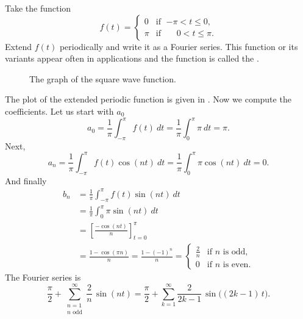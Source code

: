 \documentclass[12pt]{book}
\begin{document}
\begin{example}
Take the function
\begin{equation*}
f(t) =
\begin{cases}
0 & \text{if } \;{-\pi} < t \leq 0 , \\
\pi & \text{if } \;\phantom{-}0 < t \leq \pi .
\end{cases}
\end{equation*}
\nopagebreak[4]%
Extend $f(t)$ periodically and write it 
as a Fourier series.  This function or its variants appear often
in applications and the function is called the
\emph{}.

\begin{figure}[h!t]
\capstart
\begin{center}
\caption{The graph of the square wave function.\label{ts:squarewavefig}}
\end{center}
\end{figure}

The plot of the extended periodic function is given in
.
Now we compute the coefficients.  Let us start with $a_0$
\begin{equation*}
a_0 = \frac{1}{\pi} \int_{-\pi}^\pi f(t) ~dt
= \frac{1}{\pi} \int_{0}^\pi \pi ~dt = \pi .
\end{equation*}
Next,
\begin{equation*}
a_n = \frac{1}{\pi} \int_{-\pi}^\pi f(t) \cos (nt) ~dt 
= \frac{1}{\pi} \int_{0}^\pi \pi \cos (nt) ~dt = 0 .
\end{equation*}
And finally
\begin{equation*}
\begin{split}
b_n & = \frac{1}{\pi} \int_{-\pi}^\pi f(t) \sin (nt) ~dt \\
& = \frac{1}{\pi} \int_{0}^\pi \pi \sin (nt) ~dt \\
& = \left[ \frac{- \cos (nt)}{n} \right]_{t=0}^\pi \\
& = \frac{1 - \cos (\pi n)}{n}
= \frac{1 - {(-1)}^n}{n}
=
\begin{cases}
\frac{2}{n} & \text{if } n \text{ is odd} , \\
0 & \text{if } n \text{ is even} .
\end{cases}
\end{split}
\end{equation*}
The Fourier series is
\begin{equation*}
\frac{\pi}{2} +  \sum_{\substack{n=1\\n \text{ odd}}}^\infty
\frac{2}{n} \,
\sin (n t)
=
\frac{\pi}{2} + \sum_{k=1}^\infty
\frac{2}{2k-1} \,
\sin \bigl( (2k-1)\, t \bigr) .
\end{equation*}


\end{example}
\end{document}
